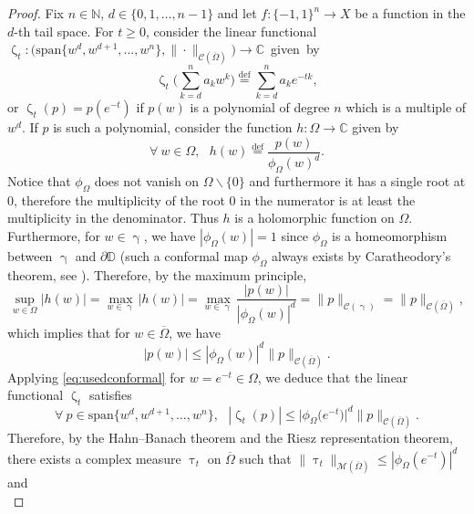 \documentclass[11pt,reqno]{amsart}
\renewcommand{\leq}{\leqslant}
\renewcommand{\geq}{\geqslant}
\renewcommand{\setminus}{\smallsetminus}
\renewcommand{\gamma}{\upgamma}
\newcommand{\1}{\mathbf 1}
\theoremstyle{remark}
\renewcommand{\tau}{\uptau}
\newcommand{\C}{\mathbb C}
\newcommand{\N}{\mathbb N}
\newcommand{\eqdef}{\stackrel{\mathrm{def}}{=}}
\renewcommand{\gamma}{\upgamma}
\renewcommand{\zeta}{\upzeta}
\newcommand{\mb}{\mathbb}
\newcommand{\ms}{\mathscr}
\begin{document}
\begin{proof}
Fix $n\in\N$, $d\in\{0,1,\ldots,n-1\}$ and let $f:\{-1,1\}^n\to X$ be a function in the $d$-th tail space. For $t\geq0$, consider the linear functional \mbox{$\zeta_t:\big(\mathrm{span}\{w^d,w^{d+1},\ldots,w^n\}, \|\cdot\|_{\ms{C}(\overline{\Omega})}\big) \to\C$ given by}
\begin{equation}
\zeta_t\Big(\sum_{k=d}^n a_k w^k \Big) \eqdef \sum_{k=d}^n a_k e^{-tk},
\end{equation} 
or $\zeta_t(p) = p(e^{-t})$ if $p(w)$ is a polynomial of degree $n$ which is a multiple of $w^d$. If $p$ is such a polynomial, consider the function $h:\Omega\to\C$ given by
\begin{equation}
\forall \ w\in\Omega, \ \ \ h(w) \eqdef \frac{p(w)}{\phi_\Omega(w)^d}.
\end{equation}
Notice that $\phi_\Omega$ does not vanish on $\Omega\setminus\{0\}$ and furthermore it has a single root at 0, therefore the multiplicity of the root 0  in the numerator is at least the multiplicity in the denominator. Thus $h$ is a holomorphic function on $\Omega$. Furthermore, for $w\in\gamma$, we have $|\phi_\Omega(w)| = 1$ since $\phi_\Omega$ is a homeomorphism between $\gamma$ and $\partial\mb{D}$ (such a conformal map $\phi_\Omega$ always exists by Caratheodory's theorem, see \cite[Theorem~5.1.1]{Kra06}). Therefore, by the maximum principle,
\begin{equation}
\sup_{w\in\Omega} |h(w)| = \max_{w\in\gamma} |h(w)| = \max_{w\in\gamma} \frac{|p(w)|}{|\phi_\Omega(w)|^d} = \|p\|_{\ms{C}(\gamma)}= \|p\|_{\ms{C}(\overline{\Omega})},
\end{equation}
which implies that for $w\in\overline{\Omega}$, we have
\begin{equation} \label{eq:usedconformal}
|p(w)| \leq |\phi_\Omega(w)|^d \|p\|_{\ms{C}(\overline{\Omega})}.
\end{equation}
Applying \eqref{eq:usedconformal} for $w=e^{-t}\in\Omega$, we deduce that the linear functional $\zeta_t$ satisfies
\begin{equation} \label{ineq1}
\forall \ p\in\mathrm{span}\{w^d,w^{d+1},\ldots,w^n\}, \ \ \ |\zeta_t(p)| \leq \big|\phi_\Omega\big(e^{-t}\big)\big|^d \|p\|_{\ms{C}(\overline{\Omega})}.
\end{equation}
Therefore, by the Hahn--Banach theorem and the Riesz representation theorem, there exists a complex measure $\tau_t$ on $\overline{\Omega}$ such that $\|\tau_t\|_{\ms{M}(\overline{\Omega})} \leq |\phi_\Omega(e^{-t})|^d$ and
\begin{equation} \label{ide1}

\end{equation}
\end{proof}
\end{document}
